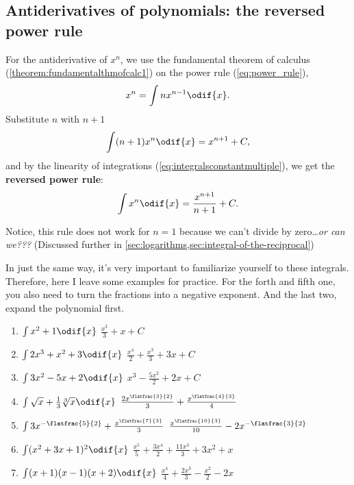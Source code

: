 \subsection{Antiderivatives of polynomials: the reversed power rule}
\label{sec:reversed-power-rule}

For the antiderivative of $x^n$, we use the fundamental theorem of calculus (\cref{theorem:fundamentalthmofcalc1}) on the power rule (\cref{eq:power_rule}),
\begin{equation*}
	x^n = \int nx^{n - 1} \odif{x}.
\end{equation*}
Substitute $n$ with $n + 1$
\begin{equation*}
	\int (n + 1)x^{n}\odif{x} = x^{n + 1} + C,
\end{equation*}
and by the linearity of integrations (\cref{eq:integralsconstantmultiple}), we get the \textbf{reversed power rule}:
\begin{equation}
	\int x^{n}\odif{x} = \frac{x^{n + 1}}{n + 1} + C. \label{eq:reversed-power-rule}
\end{equation}

Notice, this rule does not work for $n = 1$ because we can't divide by zero\dots \emph{or can we???} (Discussed further in \cref{sec:logarithms,sec:integral-of-the-reciprocal})

In just the same way, it's very important to familiarize yourself to these integrals. Therefore, here I leave some examples for practice. For the forth and fifth one, you also need to turn the fractions into a negative exponent. And the last two, expand the polynomial first.
\begin{enumerate}
	\item $\int x^2 + 1\odif{x}$ \hfill $\frac{x^3}{3} + x + C$
	\item $\int 2x^3 + x^2 + 3\odif{x}$ \hfill $\frac{x^4}{2} + \frac{x^3}{3} + 3x + C$
	\item $\int 3x^2 - 5x + 2\odif{x}$ \hfill $x^3 - \frac{5x^2}{2} + 2x + C$
	\item $\int \sqrt{x} + \frac{1}{3}\sqrt[3]{x}\odif{x}$ \hfill $\frac{2x^{\flatfrac{3}{2}}}{3} + \frac{x^{\flatfrac{4}{3}}}{4}$
	\item $\int 3x^{-\flatfrac{5}{2}} + \frac{x^{\flatfrac{7}{3}}}{3}$ \hfill $\frac{x^{\flatfrac{10}{3}}}{10} - 2x^{-\flatfrac{3}{2}}$
	\item $\int (x^2 + 3x + 1)^2 \odif{x}$ \hfill $\frac{x^5}{5} + \frac{3x^4}{2} + \frac{11x^3}{3} + 3x^2 + x$
	\item $\int (x + 1)(x - 1)(x + 2)\odif{x}$ \hfill $\frac{x^4}{4} + \frac{2x^3}{3} - \frac{x^2}{2} - 2x$
\end{enumerate}

